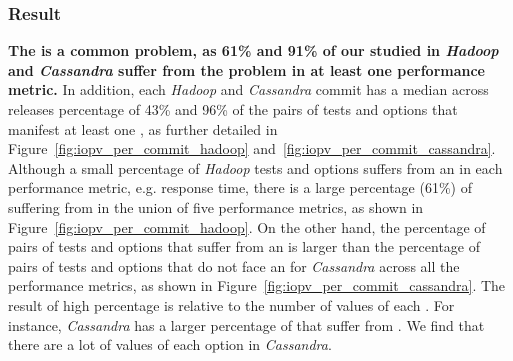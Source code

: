 \subsubsection*{Result}

\noindent \textbf{The \inconsistent is a common problem, as 61\% and 91\% of our studied \instance in \emph{Hadoop} and \emph{Cassandra} suffer from the \inconsistent problem in at least one performance metric.} In addition, each \emph{Hadoop} and \emph{Cassandra} commit has a median across releases %
percentage of 43\% and 96\% of the pairs of tests and options that manifest at least one \inconsistent, as further detailed in Figure~\ref{fig:iopv_per_commit_hadoop} and~\ref{fig:iopv_per_commit_cassandra}. Although a small percentage of \emph{Hadoop} tests and options suffers from an \inconsistent in each performance metric, e.g. response time, there is a large percentage (61\%) of \instance suffering from \inconsistent in the union of five performance metrics, as shown in Figure~\ref{fig:iopv_per_commit_hadoop}. %
On the other hand, the percentage of pairs of tests and options that suffer from an \inconsistent is larger than the percentage of pairs of tests and options that do not face an \inconsistent for \emph{Cassandra} across all the performance metrics, as shown in Figure~\ref{fig:iopv_per_commit_cassandra}. The result of high percentage is relative to the number of values of each \instance. For instance, \emph{Cassandra} has a larger percentage of \instance that suffer from \inconsistent. We find that there are a lot of values of each option in \emph{Cassandra}.  %

